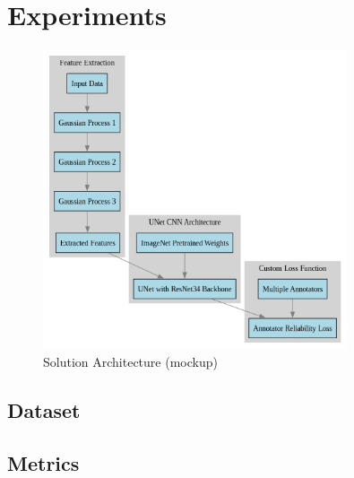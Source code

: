 \section{Experiments}

\begin{figure}[h]
  \centering
  \includegraphics[width=0.8\textwidth]{Cap4/Figures/solution_architecture.png}
  \caption{Solution Architecture (mockup)}
  \label{fig:solution_architecture}
\end{figure}

\subsection{Dataset}

\subsection{Metrics}
